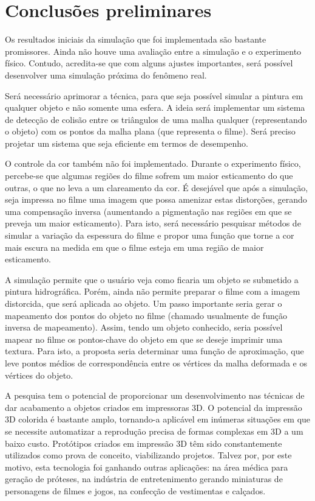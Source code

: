 
\acresetall 

\section{Conclusões preliminares}

Os resultados iniciais da simulação que foi implementada são bastante promissores. Ainda não houve uma avaliação entre a simulação e o experimento físico. Contudo, acredita-se que com alguns ajustes importantes, será possível desenvolver uma simulação próxima do fenômeno real.

Será necessário aprimorar a técnica, para que seja possível simular a pintura em qualquer objeto e não somente uma esfera. A ideia será implementar um sistema de detecção de colisão entre os triângulos de uma malha qualquer (representando o objeto) com os pontos da malha plana (que representa o filme). Será preciso projetar um sistema que seja eficiente em termos de desempenho.

O controle da cor também não foi implementado. Durante o experimento físico, percebe-se que algumas regiões do filme sofrem um maior esticamento do que outras, o que no leva a um clareamento da cor. É desejável que após a simulação, seja impressa no filme uma imagem que possa amenizar estas distorções, gerando uma compensação inversa (aumentando a pigmentação nas regiões em que se preveja um maior esticamento). Para isto, será necessário pesquisar métodos de simular a variação da espessura do filme e propor uma função que torne a cor mais escura na medida em que o filme esteja em uma região de maior esticamento.

A simulação permite que o usuário veja como ficaria um objeto se submetido a pintura hidrográfica. Porém, ainda não permite preparar o filme com a imagem distorcida, que será aplicada ao objeto. Um passo importante seria gerar o mapeamento dos pontos do objeto no filme (chamado usualmente de função inversa de mapeamento). Assim, tendo um objeto conhecido, seria possível mapear no filme os pontos-chave do objeto em que se deseje imprimir uma textura. Para isto, a proposta seria determinar uma função de aproximação, que leve pontos médios de correspondência entre os vértices da malha deformada e os vértices do objeto.

A pesquisa tem o potencial de proporcionar um desenvolvimento nas técnicas de dar acabamento a objetos criados em impressoras 3D. O potencial da impressão 3D colorida é bastante amplo, tornando-a aplicável em inúmeras situações em que se necessite automatizar a reprodução precisa de formas complexas em 3D a um baixo custo. Protótipos criados em impressão 3D têm sido constantemente utilizados como prova de conceito, viabilizando projetos. Talvez por, por este motivo, esta tecnologia foi ganhando outras aplicações: na área médica para geração de próteses, na indústria de entretenimento gerando miniaturas de personagens de filmes e jogos, na confecção de vestimentas e calçados.

